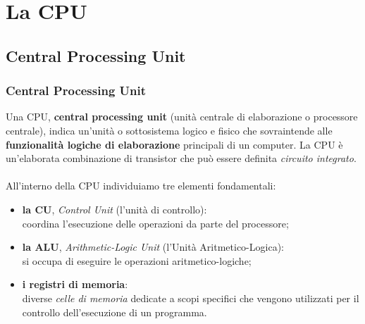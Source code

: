 \section[La CPU]{La CPU}
\label{sec:cpu}


\subsection[Central Processing Unit]{Central Processing Unit}
\begin{frame}
	\frametitle{Central Processing Unit}
	
		Una CPU, \textbf{central processing unit} (unità centrale di elaborazione o processore centrale), indica un'unità o sottosistema logico e fisico che sovraintende alle \textbf{funzionalità logiche di elaborazione} principali di un computer.
		La CPU è un'elaborata combinazione di transistor che può essere definita \textit{circuito integrato}.\\~\\
		\pause
		All'interno della CPU individuiamo tre elementi fondamentali:
		\begin{itemize}
			\item \textbf{la CU}, \textit{Control Unit} (l’unità di controllo):\\
			coordina l'esecuzione delle operazioni da parte del processore;
			\item \textbf{la ALU}, \textit{Arithmetic-Logic Unit} (l’Unità Aritmetico-Logica):\\
			si occupa di eseguire le operazioni aritmetico-logiche;
			\item \textbf{i registri di memoria}:\\
			diverse \textit{celle di memoria} dedicate a scopi specifici che vengono utilizzati per il controllo dell'esecuzione di un programma.
		\end{itemize}
	
\end{frame}



